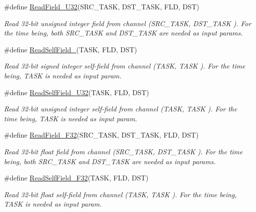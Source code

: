 \begin{DoxyCompactItemize}
\#define \hyperlink{group__interpow__read__write_ga07f39dc21983a79a7be2e8ef9ae35782}{Read\+Field\+\_\+\+U32}(S\+R\+C\+\_\+\+T\+A\+SK,  D\+S\+T\+\_\+\+T\+A\+SK,  F\+LD,  D\+ST)
\begin{DoxyCompactList}\small\item\em Read 32-\/bit unsigned integer field from channel ({\itshape S\+R\+C\+\_\+\+T\+A\+SK}, {\itshape D\+S\+T\+\_\+\+T\+A\+SK} ). For the time being, both S\+R\+C\+\_\+\+T\+A\+SK and D\+S\+T\+\_\+\+T\+A\+SK are needed as input params. \end{DoxyCompactList}\item 
\#define \hyperlink{group__interpow__read__write_ga9d4cd63895f96938b8ab7803f207cfc8}{Read\+Self\+Field\+\_}(T\+A\+SK,  F\+LD,  D\+ST)
\begin{DoxyCompactList}\small\item\em Read 32-\/bit signed integer self-\/field from channel ({\itshape T\+A\+SK}, {\itshape T\+A\+SK} ). For the time being, T\+A\+SK is needed as input param. \end{DoxyCompactList}\item 
\#define \hyperlink{group__interpow__read__write_gaab34eabd6d6070eeac30f62183465eaa}{Read\+Self\+Field\+\_\+\+U32}(T\+A\+SK,  F\+LD,  D\+ST)
\begin{DoxyCompactList}\small\item\em Read 32-\/bit unsigned integer self-\/field from channel ({\itshape T\+A\+SK}, {\itshape T\+A\+SK} ). For the time being, T\+A\+SK is needed as input param. \end{DoxyCompactList}\item 
\#define \hyperlink{group__interpow__read__write_gaab3f80ded63f88a54d0e32accbd23dfc}{Read\+Field\+\_\+\+F32}(S\+R\+C\+\_\+\+T\+A\+SK,  D\+S\+T\+\_\+\+T\+A\+SK,  F\+LD,  D\+ST)
\begin{DoxyCompactList}\small\item\em Read 32-\/bit float field from channel ({\itshape S\+R\+C\+\_\+\+T\+A\+SK}, {\itshape D\+S\+T\+\_\+\+T\+A\+SK} ). For the time being, both S\+R\+C\+\_\+\+T\+A\+SK and D\+S\+T\+\_\+\+T\+A\+SK are needed as input params. \end{DoxyCompactList}\item 
\#define \hyperlink{group__interpow__read__write_ga43b5191399959c594506d289ed455127}{Read\+Self\+Field\+\_\+\+F32}(T\+A\+SK,  F\+LD,  D\+ST)
\begin{DoxyCompactList}\small\item\em Read 32-\/bit float self-\/field from channel ({\itshape T\+A\+SK}, {\itshape T\+A\+SK} ). For the time being, T\+A\+SK is needed as input param. \end{DoxyCompactList}\item 

\end{DoxyCompactItemize}
